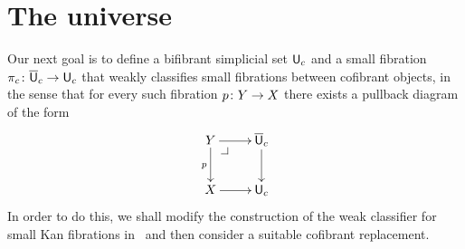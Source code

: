 \documentclass[reqno,10pt,a4paper,oneside,draft]{amsart}
\begin{document}




\newpage

\section{The universe}

Our next goal is to define a bifibrant simplicial set $\mathsf{U}_c$ and a small fibration $\pi_c \colon \overline{\mathsf{U}}_c \to \mathsf{U}_c$ that weakly classifies small fibrations between cofibrant objects, in the sense that for every such fibration $p \colon Y \to X$ there exists a pullback diagram of the form
\[
\xymatrix{
Y \ar[r] \ar[d]_p \drpullback  & \UU_c \ar[d] \\
X \ar[r] &  \U_c }
\]
In order to do this, we shall modify  the construction of the weak classifier for small Kan fibrations 
in~\cite{voevodsky-simplicial-model} and then consider a suitable cofibrant replacement. 

\medskip
\end{document}

